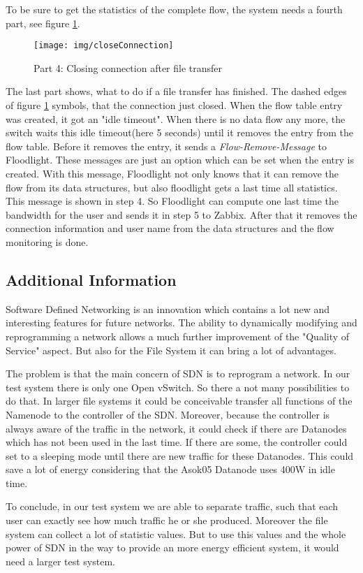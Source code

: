 To be sure to get the statistics of the complete flow, the system needs a fourth part, see figure \ref{cc}.  

\begin{figure}[ht]
\centering
\texttt{[image: img/closeConnection]} 
\caption{Part 4: Closing connection after file transfer}
\label{cc}
\end{figure}

The last part shows, what to do if a file transfer has finished. The dashed edges of figure \ref{cc} symbols, that the connection just closed. When the flow table entry was created, it got an "idle timeout"\cite[p. 11]{ofspec}. When there is no data flow any more, the switch waits this idle timeout(here 5 seconds) until it removes the entry from the flow table. Before it removes the entry, it sends a \textit{Flow-Remove-Message}\cite[p. 37]{ofspec} to Floodlight. These messages are just an option which can be set when the entry is created. With this message, Floodlight not only knows that it can remove the flow from its data structures, but also floodlight gets a last time all statistics. This message is shown in step 4. So Floodlight can compute one last time the bandwidth for the user and sends it in step 5 to Zabbix. After that it removes the connection information and user name from the data structures and the flow monitoring is done.

\subsection{Additional Information}

Software Defined Networking is an innovation which contains a lot new and interesting features for future networks. The ability to dynamically modifying and reprogramming a network allows a much further improvement of the "Quality of Service" aspect. But also for the File System it can bring a lot of advantages.

The problem is that the main concern of SDN is to reprogram a network. In our test system there is only one Open vSwitch. So there a not many possibilities to do that. In larger file systems it could be conceivable transfer all functions of the Namenode to the controller of the SDN. Moreover, because the controller is always aware of the traffic in the network, it could check if there are Datanodes which has not been used in the last time. If there are some, the controller could set to a sleeping mode until there are new traffic for these Datanodes. This could save a lot of energy considering that the Asok05 Datanode uses 400W in idle time. 

To conclude, in our test system we are able to separate traffic, such that each user can exactly see how much traffic he or she produced. Moreover the file system can collect a lot of statistic values. But to use this values and the whole power of SDN in the way to provide an more energy efficient system, it would need a larger test system.  
